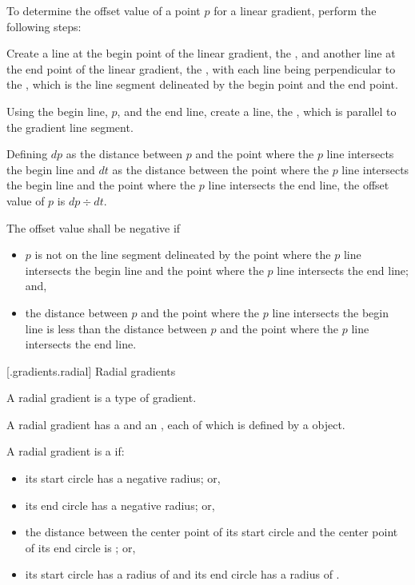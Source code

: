 \pnum
To determine the offset value of a point $p$ for a linear gradient, perform the following steps:
\begin{enumeratea}
\item Create a line at the begin point of the linear gradient, the , and another line at the end point of the linear gradient, the , with each line being perpendicular to the , which is the line segment delineated by the begin point and the end point.

\item Using the begin line, $p$, and the end line, create a line, the , which is parallel to the gradient line segment.

\item Defining $dp$ as the distance between $p$ and the point where the $p$ line intersects the begin line and $dt$ as the distance between the point where the $p$ line intersects the begin line and the point where the $p$ line intersects the end line, the offset value of $p$ is $dp \div dt$.

\item The offset value shall be negative if
\begin{itemize}
\item $p$ is not on the line segment delineated by the point where the $p$ line intersects the begin line and the point where the $p$ line intersects the end line; and,

\item the distance between $p$ and the point where the $p$ line intersects the begin line is less than the distance between $p$ and the point where the $p$ line intersects the end line.
\end{itemize}
\end{enumeratea}

 [\iotwod.gradients.radial] {Radial gradients}

\pnum
A radial gradient is a type of gradient.

\pnum
A radial gradient has a  and an , each of which is defined by a  object.

\pnum
A radial gradient is a  if:
\begin{itemize}
\item its start circle has a negative radius; or,
\item its end circle has a negative radius; or,
\item the distance between the center point of its start circle and the center point of its end circle is ; or,
\item its start circle has a radius of  and its end circle has a radius of .
\end{itemize}

